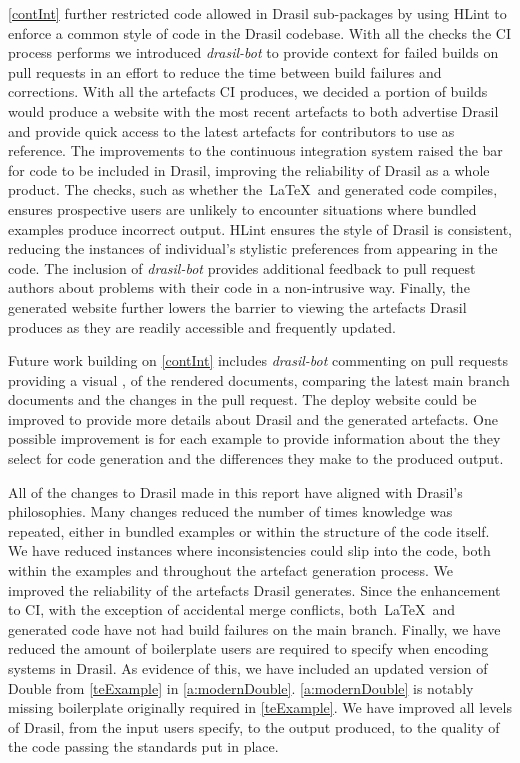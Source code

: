 \autoref{contInt} further restricted code allowed in Drasil sub-packages by using HLint to enforce a common style of code in the Drasil codebase. With all the checks the CI process performs we introduced \textit{drasil-bot} to provide context for failed builds on pull requests in an effort to reduce the time between build failures and corrections. With all the artefacts CI produces, we decided a portion of builds would produce a website with the most recent artefacts to both advertise Drasil and provide quick access to the latest artefacts for contributors to use as reference. The improvements to the continuous integration system raised the bar for code to be included in Drasil, improving the reliability of Drasil as a whole product. The checks, such as whether the\ \LaTeX\ and generated code compiles, ensures prospective users are unlikely to encounter situations where bundled examples produce incorrect output. HLint ensures the style of Drasil is consistent, reducing the instances of individual's stylistic preferences from appearing in the code. The inclusion of \textit{drasil-bot} provides additional feedback to pull request authors about problems with their code in a non-intrusive way. Finally, the generated website further lowers the barrier to viewing the artefacts Drasil produces as they are readily accessible and frequently updated. 

Future work building on \autoref{contInt} includes \textit{drasil-bot} commenting on pull requests providing a visual , of the rendered documents, comparing the latest main branch documents and the changes in the pull request. The deploy website could be improved to provide more details about Drasil and the generated artefacts. One possible improvement is for each example to provide information about the  they select for code generation and the differences they make to the produced output. 

All of the changes to Drasil made in this report have aligned with Drasil's philosophies. Many changes reduced the number of times knowledge was repeated, either in bundled examples or within the structure of the code itself. We have reduced instances where inconsistencies could slip into the code, both within the examples and throughout the artefact generation process. We improved the reliability of the artefacts Drasil generates. Since the enhancement to CI, with the exception of accidental merge conflicts, both\ \LaTeX\ and generated code have not had build failures on the main branch. Finally, we have reduced the amount of boilerplate users are required to specify when encoding systems in Drasil. As evidence of this, we have included an updated version of Double from \autoref{teExample} in \autoref{a:modernDouble}. \autoref{a:modernDouble} is notably missing boilerplate originally required in \autoref{teExample}. We have improved all levels of Drasil, from the input users specify, to the output produced, to the quality of the code passing the standards put in place.
